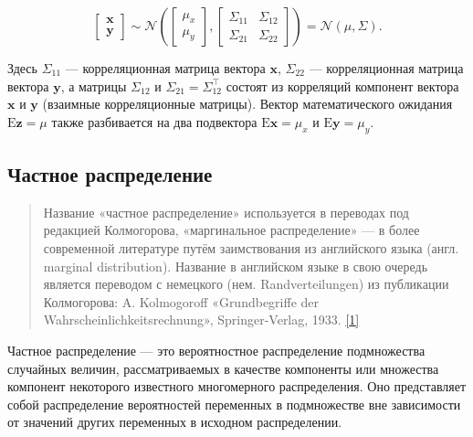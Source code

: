\documentclass[11pt,a4paper]{article}
\begin{document}
\[
\begin{bmatrix}
    \mathbf{x} \\
    \mathbf{y}
\end{bmatrix}
\sim
\mathcal{N}\left(
\begin{bmatrix}
    \mu_x \\
    \mu_y
\end{bmatrix},
\begin{bmatrix}
    \Sigma_{11} & \Sigma_{12} \\
    \Sigma_{21} & \Sigma_{22}
\end{bmatrix}
\right)
= \mathcal{N}(\mu, \Sigma).
\]

Здесь \(\Sigma_{11}\) --- корреляционная матрица вектора \(\mathbf{x}\),
\(\Sigma_{22}\) --- корреляционная матрица вектора \(\mathbf{y}\), а
матрицы \(\Sigma_{12}\) и \(\Sigma_{21} = \Sigma_{12}^\top\) состоят из
корреляций компонент вектора \(\mathbf{x}\) и \(\mathbf{y}\) (взаимные
корреляционные матрицы). Вектор математического ожидания
\(\mathrm{E}\mathbf{z} = \mu\) также разбивается на два
подвектора \(\mathrm{E}\mathbf{x} = \mu_x\) и
\(\mathrm{E}\mathbf{y} = \mu_y\).

    \hypertarget{ux447ux430ux441ux442ux43dux44bux435-ux43cux430ux440ux433ux438ux43dux430ux43bux44cux43dux44bux435-ux440ux430ux441ux43fux440ux435ux434ux435ux43bux435ux43dux438ux44f}{%
\subsection{Частное
распределение}\label{ux447ux430ux441ux442ux43dux44bux435-ux43cux430ux440ux433ux438ux43dux430ux43bux44cux43dux44bux435-ux440ux430ux441ux43fux440ux435ux434ux435ux43bux435ux43dux438ux44f}}

\begin{quote}
Название «частное распределение» используется в переводах под редакцией Колмогорова, «маргинальное распределение» --- в более современной литературе путём заимствования из английского языка (англ. marginal distribution).
Название в английском языке в свою очередь является переводом с немецкого (нем. Randverteilungen) из публикации Колмогорова:
A. Kolmogoroff «Grundbegriffe der Wahrscheinlichkeitsrechnung»,
Springer-Verlag, 1933.
\href{https://ru.wikipedia.org/wiki/\%D0\%A7\%D0\%B0\%D1\%81\%D1\%82\%D0\%BD\%D0\%BE\%D0\%B5_\%D1\%80\%D0\%B0\%D1\%81\%D0\%BF\%D1\%80\%D0\%B5\%D0\%B4\%D0\%B5\%D0\%BB\%D0\%B5\%D0\%BD\%D0\%B8\%D0\%B5}{{[}1{]}}
\end{quote}

Частное распределение --- это вероятностное распределение подмножества
случайных величин, рассматриваемых в качестве компоненты или множества
компонент некоторого известного многомерного распределения. Оно
представляет собой распределение вероятностей переменных в подмножестве
вне зависимости от значений других переменных в исходном распределении.
\end{document}
